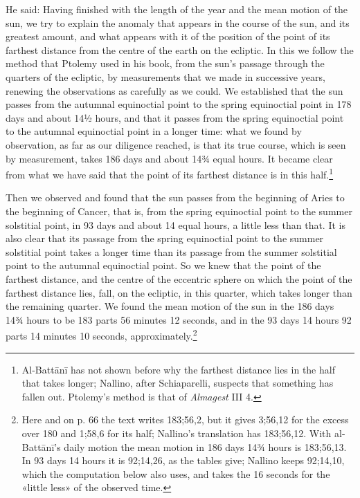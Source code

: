 \documentclass[11pt]{article}
\newcommand{\ArPage}[1]{\marginpar{\footnotesize\color{gray}Ar.\,p.\,#1}}
\begin{document}
\par \ArPage{65}He said: Having finished with the length of the year and the mean motion of the sun, we try to explain the anomaly that appears in the course of the sun, and its greatest amount, and what appears with it of the position of the point of its farthest distance from the centre of the earth on the ecliptic. In this we follow the method that Ptolemy used in his book, from the sun's passage through the quarters of the ecliptic, by measurements that we made in successive years, renewing the observations as carefully as we could. We established that the sun passes from the autumnal equinoctial point to the spring equinoctial point in 178 days and about 14½ hours, and that it passes from the spring equinoctial point to the autumnal equinoctial point in a longer time: what we found by observation, as far as our diligence reached, is that its true course, which is seen by measurement, takes 186 days and about 14¾ equal hours. It became clear from what we have said that the point of its farthest distance is in this half.\footnote{Al-Battānī has not shown before why the farthest distance lies in the half that takes longer; Nallino, after Schiaparelli, suspects that something has fallen out. Ptolemy's method is that of \emph{Almagest} III 4.}\par
\par Then we observed and found that the sun passes from the beginning of Aries to the beginning of Cancer, that is, from the spring equinoctial point to the summer solstitial point, in 93 days and about 14 equal hours, a little less than that. It is also clear that its passage from the spring equinoctial point to the summer solstitial point takes a longer time than its passage from the summer solstitial point to the autumnal equinoctial point. So we knew that the point of the farthest distance, and the centre of the eccentric sphere on which the point of the farthest distance lies, fall, on the ecliptic, in this quarter, which takes longer than the remaining quarter. We found the mean motion of the sun in the 186 days 14¾ hours to be 183 parts 56 minutes 12 seconds, and in the 93 days 14 hours 92 parts 14 minutes 10 seconds, approximately.\footnote{Here and on p. 66 the text writes 183;56,2, but it gives 3;56,12 for the excess over 180 and 1;58,6 for its half; Nallino's translation has 183;56,12. With al-Battānī's daily motion the mean motion in 186 days 14¾ hours is 183;56,13. In 93 days 14 hours it is 92;14,26, as the tables give; Nallino keeps 92;14,10, which the computation below also uses, and takes the 16 seconds for the «little less» of the observed time.}\par
\end{document}
